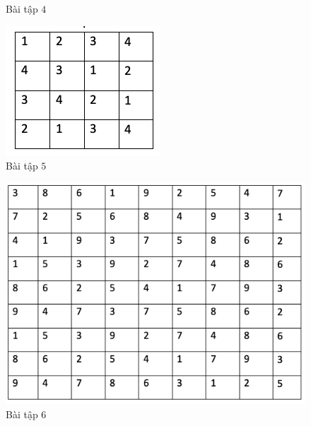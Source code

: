 \begin{multicols}{2}
\begin{figure}[H]
		\caption{\small{Bài tập $4$}}
		\vspace*{-10pt}
	\end{figure}
	\begin{figure}[H]
		\centering
		\vspace*{-5pt}
		\captionsetup{labelformat= empty, justification=centering}
		\includegraphics[width=0.9\linewidth]{sudoku5}
		\caption{\small{Bài tập $5$}}
		\vspace*{-10pt}
	\end{figure}
	\begin{figure}[H]
		\centering
		\vspace*{-5pt}
		\captionsetup{labelformat= empty, justification=centering}
		\includegraphics[width=0.9\linewidth]{sudoku6}
		\caption{\small{Bài tập $6$}}
		\vspace*{-10pt}
	\end{figure}
\end{multicols}
